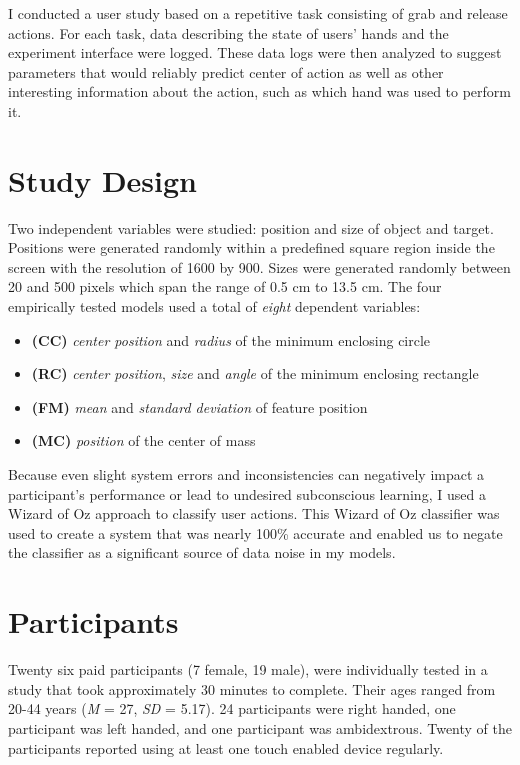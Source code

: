 \label{chapter:method}
I conducted a user study based on a repetitive task consisting of grab and
release actions.  
For each task, data describing the state of users' hands and the experiment interface were logged.  
These data logs were then analyzed to suggest parameters that would reliably
predict center of action as well as other interesting information about the
action, such as which hand was used to perform it.

\section{Study Design}
Two independent variables were studied: position and size of object and target.
Positions were generated randomly within a predefined square region inside the screen with the resolution of 1600 by 900.  Sizes were generated randomly between 20 and 500 pixels which span the range of 0.5 cm to 13.5 cm.  The four empirically tested models used a total of \textit{eight} dependent variables: 
\begin{itemize}
 \item \textbf{(CC)} \textit{center position} and \textit{radius} of the minimum enclosing circle
 \item \textbf{(RC)} \textit{center position}, \textit{size} and \textit{angle} of the minimum enclosing rectangle
 \item \textbf{(FM)} \textit{mean} and \textit{standard deviation} of feature position
 \item \textbf{(MC)} \textit{position} of the center of mass
\end{itemize}
Because even slight system errors and inconsistencies can negatively impact a participant's performance or lead to undesired subconscious learning, I used a Wizard of Oz approach to classify user actions.  
This Wizard of Oz classifier was used to create a system that was nearly 100\% accurate and enabled us to negate the classifier as a significant source of data noise in my models.

\section{Participants}
Twenty six paid participants (7 female, 19 male), were individually tested in a study that took approximately 30 minutes to complete.  Their ages ranged from 20-44 years (\textit{M} = 27, \textit{SD} = 5.17).  
24 participants were right handed, one participant was left handed, and one participant was ambidextrous.  Twenty of the participants reported using at least one touch enabled device regularly.

